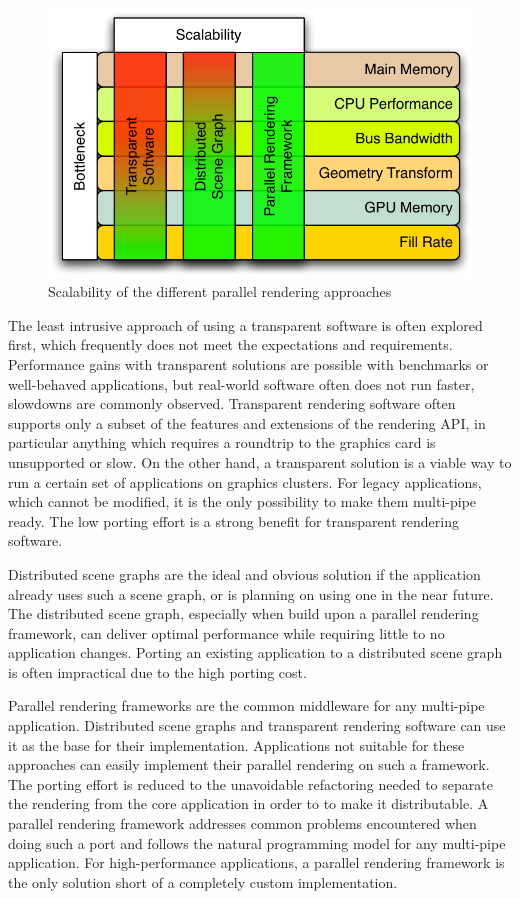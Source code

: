 \documentclass[10pt,a4paper]{scrartcl}
\begin{document}
\begin{figure}[ht]
\centering
\includegraphics[width=0.45\columnwidth]{images/parallelism.pdf}
\caption{Scalability of the different parallel rendering approaches}
\label{FIG_parallelism}
\end{figure}

The least intrusive approach of using a transparent software is often explored
first, which frequently does not meet the expectations and
requirements. Performance gains with transparent solutions are 
possible with benchmarks or well-behaved applications, but
real-world software often does not run faster, slowdowns are commonly
observed. Transparent rendering software often supports only a subset of
the features and extensions of the rendering API, in particular anything
which requires a roundtrip to the graphics card is unsupported or
slow. On the other hand, a transparent solution is a viable way to run a
certain set of applications on graphics clusters. For legacy
applications, which cannot be modified, it is the only possibility to make
them multi-pipe ready. The low porting effort is a strong benefit for
transparent rendering software.

Distributed scene graphs are the ideal and obvious solution if the
application already uses such a scene graph, or is planning on using
one in the near future. The distributed scene graph, especially when
build upon a parallel rendering framework, can deliver optimal
performance while requiring little to no application changes. Porting an
existing application to a distributed scene graph is often impractical
due to the high porting cost.

Parallel rendering frameworks are the common middleware for any
multi-pipe application. Distributed scene graphs and transparent
rendering software can use it as the base for their
implementation. Applications not suitable for these approaches
can easily implement their parallel rendering on such a framework. The
porting effort is reduced to the unavoidable refactoring needed to
separate the rendering from the core application in order to to make it
distributable. A parallel rendering framework addresses common problems
encountered when doing such a port and follows the natural programming
model for any multi-pipe application. For high-performance applications,
a parallel rendering framework is the only solution short of a
completely custom implementation.
\end{document}
